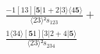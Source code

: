 \documentclass[varwidth, border=5pt]{standalone}
\begin{document}
\begin{my}
$\begin{gathered}
\scriptscriptstyle\frac{-1[13][𝟓|1+2|3⟩⟨4𝟓⟩}{⟨23⟩²s_{123}} +\\
\scriptscriptstyle\frac{1⟨34⟩[𝟓1][3|2+4|𝟓⟩}{⟨23⟩²s_{234}} \phantom{+}
\end{gathered}$
\end{my}
\end{document}
